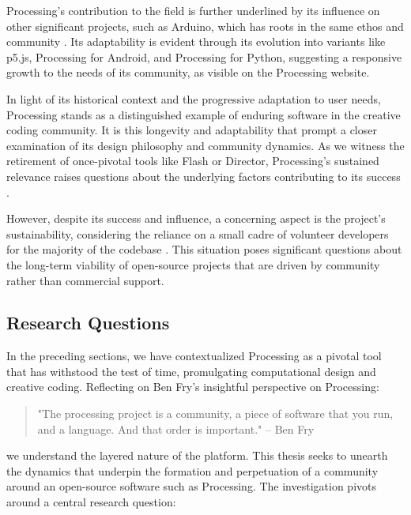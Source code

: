 Processing's contribution to the field is further underlined by its influence on other significant projects, such as Arduino, which has roots in the same ethos and community \parencite{barraganUntoldHistoryArduino2016}. Its adaptability is evident through its evolution into variants like p5.js, Processing for Android, and Processing for Python, suggesting a responsive growth to the needs of its community, as visible on the Processing website.

In light of its historical context and the progressive adaptation to user needs, Processing stands as a distinguished example of enduring software in the creative coding community. It is this longevity and adaptability that prompt a closer examination of its design philosophy and community dynamics. As we witness the retirement of once-pivotal tools like Flash or Director, Processing's sustained relevance raises questions about the underlying factors contributing to its success \parencite{hortonDeathTechnicalSkill} \parencite{steveThoughtsFlashApple2010} \parencite{FutureAdobeContribute2019}.

However, despite its success and influence, a concerning aspect is the project's sustainability, considering the reliance on a small cadre of volunteer developers for the majority of the codebase \parencite{fryModernPrometheusHistory2018}. This situation poses significant questions about the long-term viability of open-source projects that are driven by community rather than commercial support.

\subsection{Research Questions}

In the preceding sections, we have contextualized Processing as a pivotal tool that has withstood the test of time, promulgating computational design and creative coding. Reflecting on Ben Fry's insightful perspective on Processing:

\begin{quote}
"The processing project is a community, a piece of software that you run, and a language. And that order is important." – Ben Fry \parencite[19:22]{artsatmit2017CASTSymposium2017}
\end{quote}

we understand the layered nature of the platform. This thesis seeks to unearth the dynamics that underpin the formation and perpetuation of a community around an open-source software such as Processing. The investigation pivots around a central research question:

